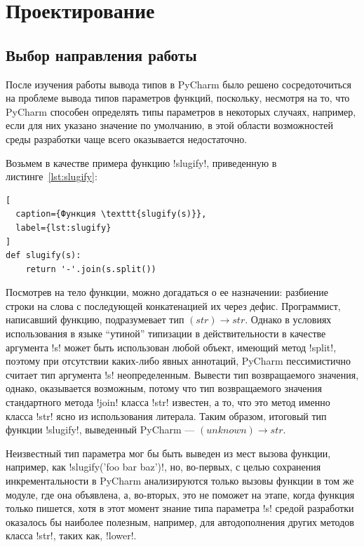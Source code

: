 \chapter{Проектирование}
\label{sec:designing}

\section{Выбор направления работы}
\label{sec:work-direction}

После изучения работы вывода типов в PyCharm было решено сосредоточиться на
проблеме вывода типов параметров функций, поскольку, несмотря на то, что PyCharm
способен определять типы параметров в некоторых случаях, например, если для них
указано значение по умолчанию, в этой области возможностей среды разработки чаще
всего оказывается недостаточно.

Возьмем в качестве примера функцию !slugify!, приведенную в
листинге~\ref{lst:slugify}:

\begin{lstlisting}[
  caption={Функция \texttt{slugify(s)}},
  label={lst:slugify}
]
def slugify(s):
    return '-'.join(s.split())
\end{lstlisting}

Посмотрев на тело функции, можно догадаться о ее назначении: разбиение строки на
слова с последующей конкатенацией их через дефис. Программист, написавший
функцию, подразумевает тип $(str) \rightarrow str$. Однако в условиях
использования в языке ``утиной'' типизации в действительности в качестве
аргумента !s! может быть использован любой объект, имеющий метод !split!,
поэтому при отсутствии каких-либо явных аннотаций, PyCharm пессимистично считает
тип аргумента !s!  неопределенным.  Вывести тип возвращаемого значения, однако,
оказывается возможным, потому что тип возвращаемого значения стандартного метода
!join! класса !str! известен, а то, что это метод именно класса !str! ясно из
использования литерала.  Таким образом, итоговый тип функции !slugify!,
выведенный PyCharm --- $(unknown) \rightarrow str$.

Неизвестный тип параметра мог бы быть выведен из мест вызова функции, например, 
как !slugify('foo bar baz')!, но, во-первых, с целью сохранения
инкрементальности в PyCharm анализируются только вызовы функции в том же модуле,
где она объявлена, а, во-вторых, это не поможет на этапе, когда функция только
пишется, хотя в этот момент знание типа параметра !s! средой разработки
оказалось бы наиболее полезным, например, для автодополнения других методов
класса !str!, таких как, !lower!.

